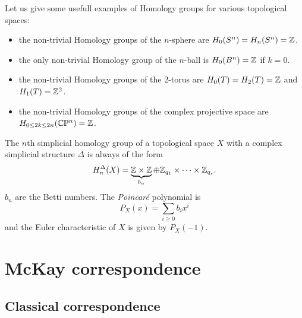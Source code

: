         \begin{examp*}
            Let us give some usefull examples of Homology groups for various topological spaces:
            \begin{itemize}
                \item the non-trivial Homology groups of the $n$-sphere are $H_0(S^n)=H_n(S^n)=\mathbb{Z}$.
                \item the only non-trivial Homology group of the $n$-ball is $H_0(B^n)=\mathbb{Z}$ if $k=0$.
                \item the non-trivial Homology groups of the 2-torus are $H_0(T)=H_2(T)=\mathbb{Z}$ and $H_1(T)=\mathbb{Z}^2$.
                \item the non-trivial Homology groups of the complex projective space are $H_{0\leq 2k\leq 2n}(\mathbb{C}\mathbb{P}^n)=\mathbb{Z}$.
            \end{itemize}
        \end{examp*}

        The $n$th simplicial homology group of a topological space $X$ with a complex simplicial structure $\Delta$ is always of the form
        \begin{equation}
            H^\Delta_n(X)=\underbrace{\mathbb{Z}\times\mathbb{Z}}_{b_n}\oplus\mathbb{Z}_{q_1}\times\dots\times\mathbb{Z}_{q_s}.
        \end{equation}
        $b_n$ are the Betti numbers. The \emph{Poincaré} polynomial is
        \begin{equation}
            P_X(x)=\sum_{i\geq 0}b_ix^i
        \end{equation}
        and the Euler characteristic of $X$ is given by $P_X(-1)$.

\section{McKay correspondence}\label{app:McKay}

    \subsection{Classical correspondence}

